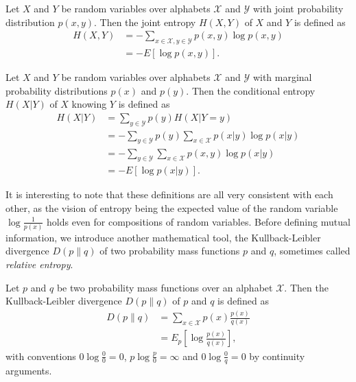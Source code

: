 \begin{appendix_definition}
    Let $X$ and $Y$ be random variables over alphabets $\mathcal{X}$ and $\mathcal{Y}$ with joint probability distribution $p(x, y)$. Then the joint entropy $H(X, Y)$ of $X$ and $Y$ is defined as
    \begin{align}
        H(X, Y) &= - \sum_{x \in \mathcal{X}, y \in \mathcal{Y}} p(x, y) \log p(x, y)\\
                &= - E[\log p(x, y)].
    \end{align}
\end{appendix_definition}

\begin{appendix_definition}
    Let $X$ and $Y$ be random variables over alphabets $\mathcal{X}$ and $\mathcal{Y}$ with marginal probability distributions $p(x)$ and $p(y)$. Then the conditional entropy $H(X|Y)$ of $X$ knowing $Y$ is defined as
    \begin{align}
        H(X|Y) &= \sum_{y \in \mathcal{Y}} p(y) H(X|Y = y)\\
                 &= - \sum_{y \in \mathcal{Y}} p(y) \sum_{x \in \mathcal{X}} p(x|y) \log p(x|y)\\
                 &= - \sum_{y \in \mathcal{Y}} \sum_{x \in \mathcal{X}} p(x, y) \log p(x|y)\\
                 &= - E[\log p(x|y)].
    \end{align}
\end{appendix_definition}

It is interesting to note that these definitions are all very consistent with each other, as the vision of entropy being the expected value of the random variable $\log \frac{1}{p(x)}$ holds even for compositions of random variables. Before defining mutual information, we introduce another mathematical tool, the Kullback-Leibler divergence $D(p \parallel q)$ of two probability mass functions $p$ and $q$, sometimes called \textit{relative entropy}.

\begin{appendix_definition}
    Let $p$ and $q$ be two probability mass functions over an alphabet $\mathcal{X}$. Then the Kullback-Leibler divergence $D(p \parallel q)$ of $p$ and $q$ is defined as
    \begin{align}
        D(p \parallel q) &= \sum_{x \in \mathcal{X}} p(x) \frac{p(x)}{q(x)}\\
                &= E_p\left[\log \frac{p(x)}{q(x)}\right],
    \end{align}
    with conventions $0 \log \frac{0}{0} = 0$, $p \log \frac{p}{0} = \infty$ and $0 \log \frac{0}{q} = 0$ by continuity arguments.
\end{appendix_definition}

